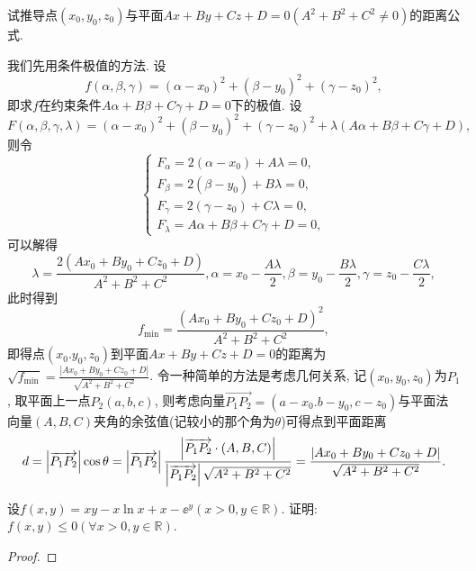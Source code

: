 \begin{quiza}
\begin{solution}
\end{solution}
\woe 试推导点\((x_0,y_0,z_0)\)与平面\(Ax+By+Cz+D=0(A^2+B^2+C^2\ne 0)\)的距离公式.
\begin{solution}
我们先用条件极值的方法. 设\[f(\alpha,\beta,\gamma)=(\alpha-x_0)^2+(\beta-y_0)^2+(\gamma-z_0)^2,\]即求\(f\)在约束条件\(A\alpha+B\beta+C\gamma+D=0\)下的极值. 设\[F(\alpha,\beta,\gamma,\lambda)=(\alpha-x_0)^2+(\beta-y_0)^2+(\gamma-z_0)^2+\lambda\left(A\alpha+B\beta+C\gamma+D\right),\]则令\[\begin{cases}
F_{\alpha}=2\left(\alpha-x_0\right)+A\lambda=0,\\
F_{\beta}=2\left(\beta-y_0\right)+B\lambda=0,\\
F_{\gamma}=2\left(\gamma-z_0\right)+C\lambda=0,\\
F_{\lambda}=A\alpha+B\beta+C\gamma+D=0,
\end{cases}\]
可以解得\[\lambda=\frac{2(Ax_0+By_0+Cz_0+D)}{A^2+B^2+C^2},\alpha=x_0-\frac{A\lambda}{2},\beta=y_0-\frac{B\lambda}{2},\gamma=z_0-\frac{C\lambda}{2},\]此时得到\[f_{\min}=\frac{\left(Ax_0+By_0+Cz_0+D\right)^2}{A^2+B^2+C^2},\]即得点\((x_0.y_0,z_0)\)到平面\(Ax+By+Cz+D=0\)的距离为\(\sqrt{f_{\min}}=\frac{\left|Ax_0+By_0+Cz_0+D\right|}{\sqrt{A^2+B^2+C^2}}\).
\tcbline
令一种简单的方法是考虑几何关系, 记\((x_0,y_0,z_0)\)为\(P_1\), 取平面上一点\(P_2(a,b,c)\), 则考虑向量\(\overrightarrow{P_1P_2}=\left(a-x_0.b-y_0,c-z_0\right)\)与平面法向量\((A,B,C)\)夹角的余弦值(记较小的那个角为\(\theta\))可得点到平面距离\[d=\left|\overrightarrow{P_1P_2}\right|\cos\theta=\left|\overrightarrow{P_1P_2}\right|\frac{\left|\overrightarrow{P_1P_2}\cdot\left(A,B,C\right)\right|}{\left|\overrightarrow{P_1P_2}\right|\sqrt{A^2+B^2+C^2}}=\frac{\left|Ax_0+By_0+Cz_0+D\right|}{\sqrt{A^2+B^2+C^2}}.\qedhere\]
\end{solution}
\woe 设\(f(x,y)=xy-x\ln x+x-\ee^y(x>0,y\in\mathbb{R})\). 证明: \(f(x,y)\leqslant 0(\forall x>0,y\in\mathbb{R})\).
\begin{proof}

\end{proof}
\end{quiza}

